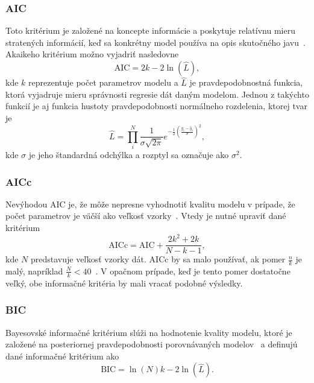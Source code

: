 \subsubsection*{AIC}
Toto kritérium je založené na koncepte informácie a poskytuje relatívnu mieru stratených informácií, keď sa konkrétny model používa na opis skutočného javu~\cite{emiliano:stand_crit:2014}. Akaikeho kritérium možno vyjadriť nasledovne
\begin{equation}
	\text{AIC} = 2k - 2\ln\left( \hat{L} \right),
\end{equation}
kde $ k $ reprezentuje počet parametrov modelu a $ \hat{L} $ je pravdepodobnostná funkcia, ktorá vyjadruje mieru správnosti regresie dát daným modelom. Jednou z takýchto funkcií je aj funkcia hustoty pravdepodobnosti normálneho rozdelenia, ktorej tvar je 
\begin{equation}
	\hat{L} = \prod_i^N \frac{1}{\sigma \sqrt{2\pi}}e^{-\frac{1}{2}\left( \frac{y_i - \hat y_i}{\sigma} \right)^2},
\end{equation}
kde $ \sigma $ je jeho štandardná odchýlka a rozptyl sa označuje ako $ \sigma^2 $.

\subsubsection*{AICc}
Nevýhodou AIC je, že môže nepresne vyhodnotiť kvalitu modelu v prípade, že počet parametrov je väčší ako veľkosť vzorky~\cite{emiliano:stand_crit:2014}. Vtedy je nutné upraviť dané kritérium
\begin{equation}
	\text{AICc} = \text{AIC} + \frac{2k^2 + 2k}{N - k - 1}, 
\end{equation}
kde $ N $ predstavuje veľkosť vzorky dát. AICc by sa malo používať, ak pomer $ \frac{n}{k} $ je malý, napríklad $ \frac{N}{k} < 40$~\cite{kenneth:understanding_stand_crit:2004}. V opačnom prípade, keď je tento pomer dostatočne veľký, obe informačné kritéria by mali vracať podobné výsledky.

\subsubsection*{BIC}
Bayesovské informačné kritérium slúži na hodnotenie kvality modelu, ktoré je založené na posteriornej pravdepodobnosti porovnávaných modelov~\cite{emiliano:stand_crit:2014} a definujú dané informačné kritérium ako
\begin{equation}
	\text{BIC} = \ln\left( N \right)k - 2\ln\left( \hat{L} \right).
\end{equation}

